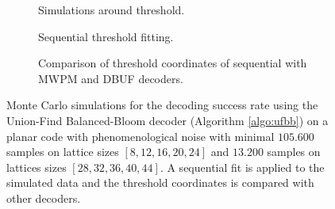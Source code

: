 \begin{figure}[htbp]
  \centering
  \begin{subfigure}[b]{0.49\textwidth}
    \begin{adjustbox}{Clip=0 1em 0 0}
      
    \end{adjustbox}
    \caption{Simulations around threshold.}
  \end{subfigure}
  \begin{subfigure}[b]{0.49\textwidth}
    \begin{adjustbox}{Clip=0 1em 0 0}
      
    \end{adjustbox}
    \caption{Sequential threshold fitting.}
  \end{subfigure}
  \begin{subfigure}[b]{\textwidth}
    \begin{adjustbox}{Clip=0 1em 0 0}
    
    \end{adjustbox}
    \caption{Comparison of threshold coordinates of sequential with MWPM and DBUF decoders.}
  \end{subfigure}
  \caption{Monte Carlo simulations for the decoding success rate using the Union-Find Balanced-Bloom decoder (Algorithm \ref{algo:ufbb}) on a planar code with phenomenological noise with minimal $105.600$ samples on lattice sizes $[8,12,16,20,24]$ and $13.200$ samples on lattices sizes $[28, 32, 36, 40, 44]$. A sequential fit is applied to the simulated data and the threshold coordinates is compared with other decoders.}
  \label{fig:thres_ufbb_planar_3d}
\end{figure}


